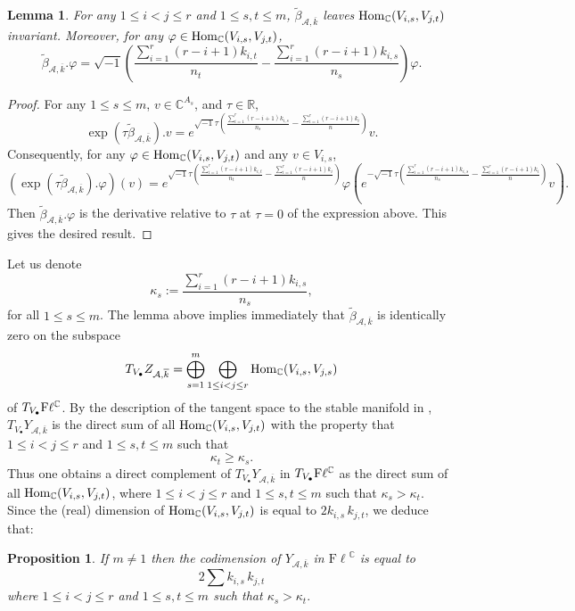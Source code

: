\documentclass[12pt]{amsart}
\newtheorem{prop}[thm]{Proposition}
\newtheorem{lem}[thm]{Lemma}
\theoremstyle{definition}
\theoremstyle{remark}
\newcommand{\RR}{\mathbb R}
\newcommand{\CC}{\mathbb C}
\newcommand{\vk}{\overline{k}}
\newcommand{\A}{{\mathcal A}}
\newcommand{\Fl}{{\mathrm{F\ell}}}
\newcommand{\be}{\A, \vk}
\newcommand{\bet}{\tilde{\beta}}
\begin{document}
\begin{lem}
For any $1 \le i <j \le r$ and $1 \le s, t \le m$, $\bet_{\be}$ leaves ${\rm Hom}_\CC (V_{i,s}, V_{ j, t})$ invariant. Moreover, for any
$\varphi\in  {\rm Hom}_\CC (V_{i,s}, V_{j, t})$,
$$\bet_{\be}.\varphi = \sqrt{-1}\left(\frac{\sum_{i=1}^r(r-i+1)k_{i,t}}{n_t}-\frac{\sum_{i=1}^r(r-i+1)k_{i,s}}{n_s}\right)\varphi.$$
\end{lem}

\begin{proof}
For any $1\le s \le m$, $v\in \CC^{A_s}$, and $\tau \in \RR$,
$$\exp(\tau\bet_{\be}).v=e^{\sqrt{-1}\tau\left(\frac{\sum_{i=1}^r(r-i+1)k_{i,s}}{n_s}-\frac{\sum_{i=1}^r(r-i+1)k_i}{n}\right)}v.$$
Consequently, for any $\varphi\in {\rm Hom}_\CC (V_{i,s}, V_{j,t})$ and any $v\in V_{i,s}$,
$$(\exp(\tau \bet_{\be}).\varphi)(v)=e^{\sqrt{-1}\tau\left(\frac{\sum_{i=1}^r(r-i+1)k_{i,t}}{n_t}-\frac{\sum_{i=1}^r(r-i+1)k_i}{n}\right)}\varphi(e^{-\sqrt{-1}\tau\left(\frac{\sum_{i=1}^r(r-i+1)k_{i,s}}{n_s}-\frac{\sum_{i=1}^r(r-i+1)k_i}{n}\right)}v).$$
Then $\bet_{\be} .\varphi$ is the derivative relative to $\tau$ at $\tau=0$ of the expression above. 
This gives the desired result.
\end{proof}

Let us denote
$$\kappa_s
:=
\frac{\sum_{i=1}^r (r-i+1)k_{i,s}}{n_s},$$
for all $1\le s\le m$. 
The lemma above implies immediately that $\bet_{\be}$ is identically zero on the subspace 
$$T_{V_\bullet}Z_{\be}= \bigoplus_{s=1}^m \bigoplus_{1\le i <j \le r} {\rm Hom}_\CC( V_{i,s}, V_{j,s})$$  
of $T_{V_\bullet}{\rm F}\ell^\CC$. 
By the description of the tangent space to the stable manifold in \cite[p.~52]{Ki}, $T_{V_\bullet} Y_{\be}$ is the direct sum of all ${\rm Hom}_\CC(V_{i,s}, V_{j,t})$ with the property that 
$1\le i<j\le r$ and $1\le s, t \le m$ such that
$$\kappa_t\ge \kappa_s.$$
Thus one obtains a direct complement of $T_{V_\bullet}Y_{\be}$ in $T_{V_\bullet} {\rm F}\ell^\CC$ as the direct sum of all ${\rm Hom}_\CC (V_{i,s}, V_{j,t})$, where $1\le i < j \le r$ and $1\le s, t\le m$ such that
 $\kappa_s>\kappa_t.$ 
 Since the (real) dimension of ${\rm Hom}_\CC (V_{i,s}, V_{j,t})$ is equal to $2k_{i,s} \, k_{j,t}$, we deduce that:
 
 \begin{prop}\label{sum} If $m \neq 1$ then the codimension of $Y_{\be}$ in $\Fl^\CC$ is equal to
\begin{equation}\label{condi}2\sum k_{i,s} \, k_{j,t}\end{equation}
 where $1\le i <j \le r$ and $1\le s,t\le m$ such that $\kappa_s> \kappa_t.$
 \end{prop}
 
\end{document}
